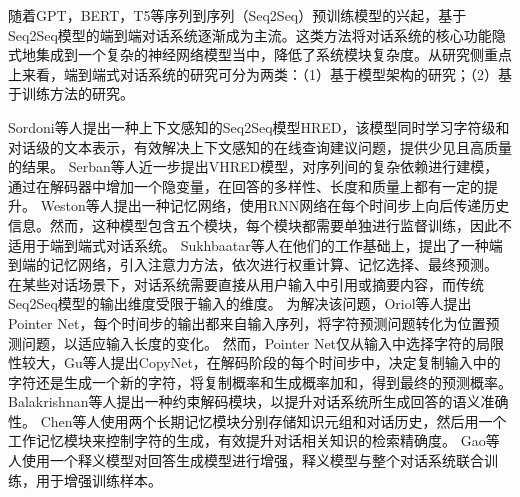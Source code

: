 随着GPT\cite{DBLP:conf/nips/BrownMRSKDNSSAA20}，BERT\cite{DBLP:conf/naacl/DevlinCLT19}，T5\cite{DBLP:journals/jmlr/RaffelSRLNMZLL20}等序列到序列（Seq2Seq）预训练模型的兴起，基于Seq2Seq模型的端到端对话系统逐渐成为主流。这类方法将对话系统的核心功能隐式地集成到一个复杂的神经网络模型当中，降低了系统模块复杂度。从研究侧重点上来看，端到端式对话系统的研究可分为两类：（1）基于模型架构的研究；（2）基于训练方法的研究。

Sordoni等人\cite{DBLP:conf/cikm/SordoniBVLSN15}提出一种上下文感知的Seq2Seq模型HRED，该模型同时学习字符级和对话级的文本表示，有效解决上下文感知的在线查询建议问题，提供少见且高质量的结果。
Serban等人\cite{DBLP:conf/aaai/SerbanSLCPCB17}近一步提出VHRED模型，对序列间的复杂依赖进行建模，通过在解码器中增加一个隐变量，在回答的多样性、长度和质量上都有一定的提升。
Weston等人\cite{DBLP:journals/corr/WestonCB14}提出一种记忆网络，使用RNN网络在每个时间步上向后传递历史信息。然而，这种模型包含五个模块，每个模块都需要单独进行监督训练，因此不适用于端到端式对话系统。
Sukhbaatar等人\cite{DBLP:conf/nips/SukhbaatarSWF15}在他们的工作基础上，提出了一种端到端的记忆网络，引入注意力方法，依次进行权重计算、记忆选择、最终预测。
在某些对话场景下，对话系统需要直接从用户输入中引用或摘要内容，而传统Seq2Seq模型的输出维度受限于输入的维度。
为解决该问题，Oriol等人\cite{DBLP:conf/nips/VinyalsFJ15}提出Pointer Net，每个时间步的输出都来自输入序列，将字符预测问题转化为位置预测问题，以适应输入长度的变化。
然而，Pointer Net仅从输入中选择字符的局限性较大，Gu等人\cite{DBLP:conf/acl/GuLLL16}提出CopyNet，在解码阶段的每个时间步中，决定复制输入中的字符还是生成一个新的字符，将复制概率和生成概率加和，得到最终的预测概率。
Balakrishnan等人\cite{DBLP:conf/acl/BalakrishnanRUW19}提出一种约束解码模块，以提升对话系统所生成回答的语义准确性。
Chen等人\cite{DBLP:conf/acl/ChenXX19}使用两个长期记忆模块分别存储知识元组和对话历史，然后用一个工作记忆模块来控制字符的生成，有效提升对话相关知识的检索精确度。
Gao等人\cite{DBLP:conf/acl/GaoZOY20}使用一个释义模型对回答生成模型进行增强，释义模型与整个对话系统联合训练，用于增强训练样本。

